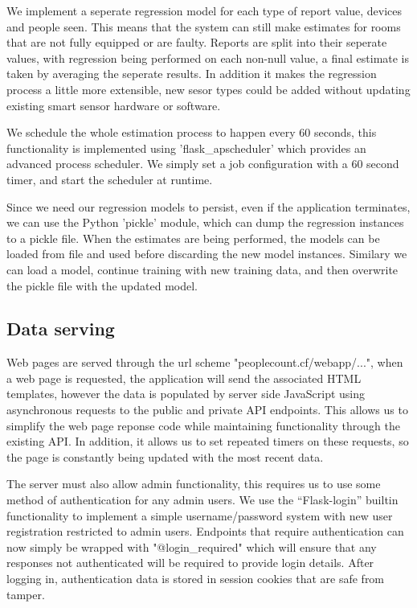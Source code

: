 \documentclass{l4proj}
\begin{document}
We implement a seperate regression model for each type of report value, devices and people seen. This means that the system can still make estimates for rooms that are not fully equipped or are faulty. Reports are split into their seperate values, with regression being performed on each non-null value, a final estimate is taken by averaging the seperate results. In addition it makes the regression process a little more extensible, new sesor types could be added without updating existing smart sensor hardware or software.

We schedule the whole estimation process to happen every 60 seconds, this functionality is implemented using 'flask\_apscheduler' which provides an advanced process scheduler. We simply set a job configuration with a 60 second timer, and start the scheduler at runtime.

Since we need our regression models to persist, even if the application terminates, we can use the Python 'pickle' module, which can dump the regression instances to a pickle file. When the estimates are being performed, the models can be loaded from file and used before discarding the new model instances. Similary we can load a model, continue training with new training data, and then overwrite the pickle file with the updated model.


\subsection{Data serving}
Web pages are served through the url scheme "peoplecount.cf/webapp/...", when a web page is requested, the application will send the associated HTML templates, however the data is populated by server side JavaScript using asynchronous requests to the public and private API endpoints. This allows us to simplify the web page reponse code while maintaining functionality through the existing API. In addition, it allows us to set repeated timers on these requests, so the page is constantly being updated with the most recent data.

The server must also allow admin functionality, this requires us to use some method of authentication for any admin users. We use the “Flask-login” builtin functionality to implement a simple username/password system with new user registration restricted to admin users. Endpoints that require authentication can now simply be wrapped with "@login\_required" which will ensure that any responses not authenticated will be required to provide login details. After logging in, authentication data is stored in session cookies that are safe from tamper.
\end{document}
